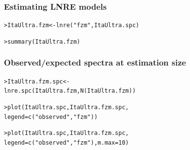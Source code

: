 \documentclass[t]{beamer} %
\begin{document}
\begin{frame}[fragile]
  \frametitle{Estimating LNRE models}

\begin{alltt}

> ItaUltra.fzm <- lnre("fzm", ItaUltra.spc)

> summary(ItaUltra.fzm)
\end{alltt}

\end{frame}


\begin{frame}[fragile]
  \frametitle{Observed/expected spectra at estimation size}
\begin{alltt}
> ItaUltra.fzm.spc <- 
  lnre.spc(ItaUltra.fzm, N(ItaUltra.fzm))

> plot(ItaUltra.spc, ItaUltra.fzm.spc,
       legend=c("observed", "fzm"))

> plot(ItaUltra.spc, ItaUltra.fzm.spc, 
       legend=c("observed", "fzm"), m.max=10)
\end{alltt}
\end{frame}










\end{document}
